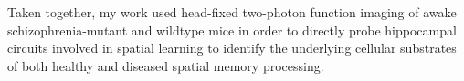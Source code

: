 Taken together, my work used head-fixed two-photon function imaging of awake schizophrenia-mutant and wildtype mice in order to directly probe hippocampal circuits involved in spatial learning to identify the underlying cellular substrates of both healthy and diseased spatial memory processing.










